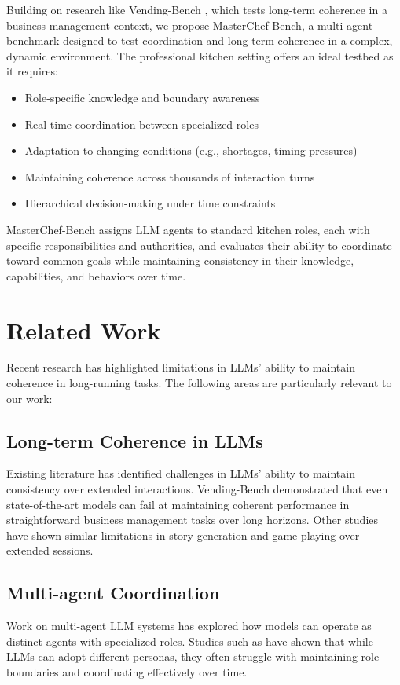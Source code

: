 \documentclass{article}
\begin{document}
Building on research like Vending-Bench \cite{backlund2025vending}, which tests long-term coherence in a business management context, we propose MasterChef-Bench, a multi-agent benchmark designed to test coordination and long-term coherence in a complex, dynamic environment. The professional kitchen setting offers an ideal testbed as it requires:

\begin{itemize}
    \item Role-specific knowledge and boundary awareness
    \item Real-time coordination between specialized roles
    \item Adaptation to changing conditions (e.g., shortages, timing pressures)
    \item Maintaining coherence across thousands of interaction turns
    \item Hierarchical decision-making under time constraints
\end{itemize}

MasterChef-Bench assigns LLM agents to standard kitchen roles, each with specific responsibilities and authorities, and evaluates their ability to coordinate toward common goals while maintaining consistency in their knowledge, capabilities, and behaviors over time.

\section{Related Work}
\label{sec:related}

Recent research has highlighted limitations in LLMs' ability to maintain coherence in long-running tasks. The following areas are particularly relevant to our work:

\subsection{Long-term Coherence in LLMs}
Existing literature has identified challenges in LLMs' ability to maintain consistency over extended interactions. Vending-Bench \cite{backlund2025vending} demonstrated that even state-of-the-art models can fail at maintaining coherent performance in straightforward business management tasks over long horizons. Other studies have shown similar limitations in story generation and game playing over extended sessions.

\subsection{Multi-agent Coordination}
Work on multi-agent LLM systems has explored how models can operate as distinct agents with specialized roles. Studies such as \cite{relevant-paper1} have shown that while LLMs can adopt different personas, they often struggle with maintaining role boundaries and coordinating effectively over time.
\end{document}
